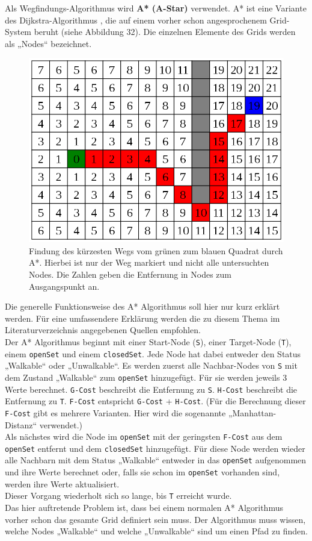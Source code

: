 \documentclass[a4paper,12pt]{article}
\newcommand{\code}{\texttt}
\begin{document}
Als Wegfindungs-Algorithmus wird \textbf{A* (A-Star)} \cite{astar} verwendet. A* ist eine Variante des Dijkstra-Algorithmus \cite{taschenbuch_der_algorithmen}, die auf einem vorher schon angesprochenem Grid-System beruht (siehe Abbildung 32). Die einzelnen Elemente des Grids werden als „Nodes“ bezeichnet.
\begin{figure}[H]
\centering
    \includegraphics[width=.8\linewidth]{Bilder/Aufgabe3/Teilaufgabe_A/AStar_01.png}
    \caption{Findung des kürzesten Wegs vom grünen zum blauen Quadrat durch A*. Hierbei ist nur der Weg markiert und nicht alle untersuchten Nodes. Die Zahlen geben die Entfernung in Nodes zum Ausgangspunkt an.}
\end{figure}

Die generelle Funktionsweise des A* Algorithmus soll hier nur kurz erklärt werden. Für eine umfassendere Erklärung werden die zu diesem Thema im Literaturverzeichnis angegebenen Quellen empfohlen.
\\[0.4cm]
Der A* Algorithmus beginnt mit einer Start-Node (\code{S}), einer Target-Node (\code{T}), einem \code{openSet} und einem \code{closedSet}. Jede Node hat dabei entweder den Status „Walkable“ oder „Unwalkable“. Es werden zuerst alle Nachbar-Nodes von \code{S} mit dem Zustand „Walkable“ zum \code{openSet} hinzugefügt. Für sie werden jeweils 3 Werte berechnet. \code{G-Cost} beschreibt die Entfernung zu \code{S}. \code{H-Cost} beschreibt die Entfernung zu \code{T}. \code{F-Cost} entspricht \code{G-Cost} + \code{H-Cost}. (Für die Berechnung dieser \code{F-Cost} gibt es mehrere Varianten. Hier wird die sogenannte „Manhattan-Distanz“ verwendet.)
\\[0.4cm]
Als nächstes wird die Node im \code{openSet} mit der geringsten \code{F-Cost} aus dem \code{openSet} entfernt und dem \code{closedSet} hinzugefügt. Für diese Node werden wieder alle Nachbarn mit dem Status „Walkable“ entweder in das \code{openSet} aufgenommen und ihre Werte berechnet oder, falls sie schon im \code{openSet} vorhanden sind, werden ihre Werte aktualisiert.
\\[0.4cm]
Dieser Vorgang wiederholt sich so lange, bis \code{T} erreicht wurde.
\\[0.4cm]
Das hier auftretende Problem ist, dass bei einem normalen A* Algorithmus vorher schon das gesamte Grid definiert sein muss. Der Algorithmus muss wissen, welche Nodes „Walkable“ und welche „Unwalkable“ sind um einen Pfad zu finden.
\end{document}

